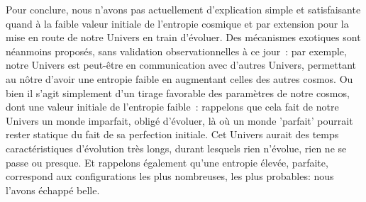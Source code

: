 Pour conclure, nous n'avons pas actuellement d'explication simple et satisfaisante quand à la faible valeur initiale de l'entropie cosmique et par extension pour la mise en route de notre Univers en train d'évoluer. Des mécanismes exotiques sont néanmoins proposés, sans validation observationnelles à ce jour~: par exemple, notre Univers est peut-être en communication avec d'autres Univers, permettant au nôtre d'avoir une entropie faible en augmentant celles des autres cosmos. Ou bien il s'agit simplement d'un tirage favorable des paramètres de notre cosmos, dont une valeur initiale de l'entropie faible~: rappelons que cela fait de notre Univers un monde imparfait, obligé d'évoluer, là où un monde 'parfait' pourrait rester statique du fait de sa perfection initiale.  Cet Univers aurait des temps caractéristiques d'évolution très longs, durant lesquels rien n'évolue, rien ne se passe ou presque. Et rappelons également qu'une entropie élevée, parfaite, correspond aux configurations les plus nombreuses, les plus probables: nous l'avons échappé belle.